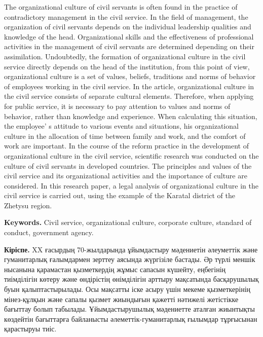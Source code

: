 The organizational culture of civil servants is often found in the
practice of contradictory management in the civil service. In the field
of management, the organization of civil servants depends on the
individual leadership qualities and knowledge of the head.
Organizational skills and the effectiveness of professional activities
in the management of civil servants are determined depending on their
assimilation. Undoubtedly, the formation of organizational culture in
the civil service directly depends on the head of the institution, from
this point of view, organizational culture is a set of values, beliefs,
traditions and norms of behavior of employees working in the civil
service. In the article, organizational culture in the civil service
consists of separate cultural elements. Therefore, when applying for
public service, it is necessary to pay attention to values and norms of
behavior, rather than knowledge and experience. When calculating this
situation, the employee' s attitude to various events and
situations, his organizational culture in the allocation of time between
family and work, and the comfort of work are important. In the course of
the reform practice in the development of organizational culture in the
civil service, scientific research was conducted on the culture of civil
servants in developed countries. The principles and values of the civil
service and its organizational activities and the importance of culture
are considered. In this research paper, a legal analysis of
organizational culture in the civil service is carried out, using the
example of the Karatal district of the Zhetysu region.

{\bfseries Keywords.} Civil service, organizational culture, corporate
culture, standard of conduct, government agency.

{\bfseries Кіріспе.} XX ғасырдың 70-жылдарында ұйымдастыру мәдениетін
әлеуметтік және гуманитарлық ғалымдармен зерттеу аясында жүргізіле
бастады. Әр түрлі меншік нысанына қарамастан қызметкердің жұмыс сапасын
күшейту, еңбегінің тиімділігін көтеру және өндірістің өнімділігін
арттыру мақсатында басқарушылық буын қалыптастырылады. Осы мақсатты іске
асыру үшін мекеме қызметкерінің мінез-құлқын және сапалы қызмет
жиындығын қажетті нәтижелі жетістікке бағыттау болып табылады.
Ұйымдастырушылық мәдениетте аталған жиынтықты көздейтін бағыттарға
байланысты әлеметтік-гуманитарлық ғылымдар тұрғысынан қарастыруы тиіс.

